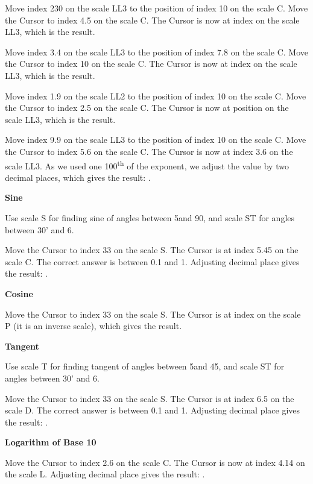 \begin{multicols*}{3}
{
Move index 230 on the scale LL3 to the position of index 10 on the scale C.
Move the Cursor to index 4.5 on the scale C.
The Cursor is now at index  on the scale LL3, which is the result.

Move index 3.4 on the scale LL3 to the position of index 7.8 on the scale C.
Move the Cursor to index 10 on the scale C.
The Cursor is now at index  on the scale LL3, which is the result.

Move index 1.9 on the scale LL2 to the position of index 10 on the scale C.
Move the Cursor to index 2.5 on the scale C.
The Cursor is now at position  on the scale LL3, which is the result.

Move index 9.9 on the scale LL3 to the position of index 10 on the scale C.
Move the Cursor to index 5.6 on the scale C.
The Cursor is now at index 3.6 on the scale LL3.
As we used one 100\textsuperscript{th} of the exponent, we adjust the value by two decimal places, which gives the result: .

  \textbf{Sine}

\footnotesize Use scale S for finding sine of angles between 5\textdegree and 90\textdegree, and scale ST for angles between 30' and 6\textdegree. \normalsize

Move the Cursor to index 33 on the scale S.
The Cursor is at index 5.45 on the scale C.
The correct answer is between 0.1 and 1. Adjusting decimal place gives the result: .

  \textbf{Cosine}

Move the Cursor to index 33 on the scale S.
The Cursor is at index  on the scale P (it is an inverse scale), which gives the result.

  \textbf{Tangent}

\footnotesize Use scale T for finding tangent of angles between 5\textdegree and 45\textdegree, and scale ST for angles between 30' and 6\textdegree. \normalsize

Move the Cursor to index 33 on the scale S.
The Cursor is at index 6.5 on the scale D.
The correct answer is between 0.1 and 1. Adjusting decimal place gives the result: .

  \textbf{Logarithm of Base 10}

Move the Cursor to index 2.6 on the scale C.
The Cursor is now at index 4.14 on the scale L.
Adjusting decimal place gives the result: .
  }
  \end{multicols*}
  

